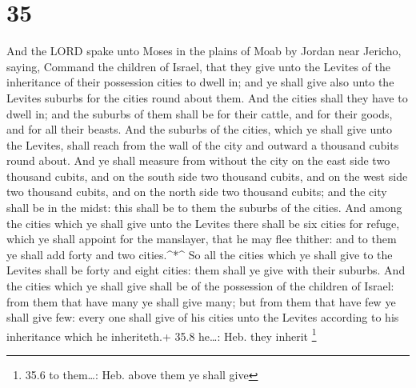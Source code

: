 \hypertarget{section-34}{%
\section{35}\label{section-34}}

 And the LORD spake unto Moses in the plains of Moab by
Jordan near Jericho, saying,  Command the children of
Israel, that they give unto the Levites of the inheritance of their
possession cities to dwell in; and ye shall give also unto the Levites
suburbs for the cities round about them.  And the cities
shall they have to dwell in; and the suburbs of them shall be for their
cattle, and for their goods, and for all their beasts.  And
the suburbs of the cities, which ye shall give unto the Levites, shall
reach from the wall of the city and outward a thousand cubits round
about.  And ye shall measure from without the city on the
east side two thousand cubits, and on the south side two thousand
cubits, and on the west side two thousand cubits, and on the north side
two thousand cubits; and the city shall be in the midst: this shall be
to them the suburbs of the cities.  And among the cities
which ye shall give unto the Levites there shall be six cities for
refuge, which ye shall appoint for the manslayer, that he may flee
thither: and to them ye shall add forty and two cities.\^{}*\^{}
 So all the cities which ye shall give to the Levites shall
be forty and eight cities: them shall ye give with their suburbs.
 And the cities which ye shall give shall be of the
possession of the children of Israel: from them that have many ye shall
give many; but from them that have few ye shall give few: every one
shall give of his cities unto the Levites according to his inheritance
which he inheriteth.+ 35.8 he\ldots: Heb. they inherit \footnote{35.6 to
  them\ldots: Heb. above them ye shall give}

